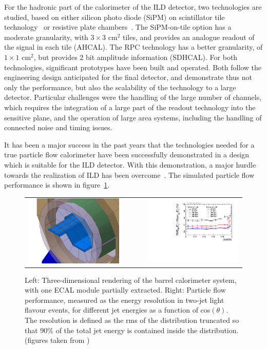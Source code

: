 \documentclass[%
 amsmath,amssymb,
 aps,
 longbibliography,
]{revtex4-1}
\begin{document}
For the hadronic part of the calorimeter of the ILD detector, two technologies are studied, based on either silicon photo diode (SiPM) on scintillator tile technology~\cite{Simon:2010mi} or resistive plate chambers~\cite{Laktineh:2010zsa}. The SiPM-on-tile option has a  moderate granularity, with $3 \times 3$ cm$^2$ tiles, and provides an analogue readout of the signal in each tile (AHCAL). The RPC technology has a better granularity, of $1 \times 1$ cm$^2$, but provides 2 bit amplitude information (SDHCAL). For both technologies, significant prototypes have been built and operated. Both follow the engineering design anticipated for the final detector, and demonstrate thus not only the performance, but also the scalability of the technology to a large detector. Particular challenges were the handling of the large number of channels, which requires the integration of a large part of the readout technology into the sensitive plane, and the operation of large area systems, including the handling of connected noise and timing issues. 

It has been a major success in the past years that the technologies needed for a true particle flow calorimeter have been successfully demonstrated in a design which is suitable for the ILD detector. With this demonstration, a major hurdle towards the realization of ILD has been overcome~\cite{Sefkow:2018rhp}. The simulated particle flow performance is shown in figure~\ref{fig:pflow}.
\begin{figure}[th]
    \centering
    \begin{tabular}{lcr}
    \includegraphics[width=0.4\hsize]{figures/ECal_insertion.jpg} & ~~~~ &
    \includegraphics[width=0.48\hsize]{figures/CosThetaLargeSmall.pdf}\\
    \end{tabular}
    \caption{Left: Three-dimensional rendering of the barrel calorimeter system, with one ECAL module partially extracted. Right: Particle flow performance, measured as the energy resolution in two-jet light flavour events, for different jet energies as a function of cos$(\theta)$. The resolution is defined as the rms of the distribution truncated so that 90\% of the total jet energy is contained inside the distribution. (figures taken from \cite{LCWS2018})}
    \label{fig:pflow}
\end{figure}
\end{document}
